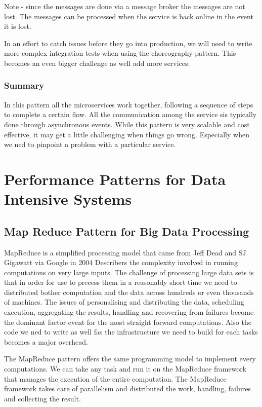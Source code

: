 \documentclass[a4paper, 11pt]{book}
\begin{document}
    Note - since the messages are done via a message broker the messages are not lost.
    The messages can be processed when the service is back online in the event it is lost.

    In an effort to catch issues before they go into production, we will need to write more complex integration tests when using the choreography pattern.
    This becomes an even bigger challenge as well add more services.

    \subsubsection{Summary}
    In this pattern all the microservices work together, following a sequence of steps to complete a certain flow.
    All the communication among the service sis typically done through asynchronous events.
    While this pattern is very scalable and cost effective, it may get a little challenging when things go wrong.
    Especially when we ned to pinpoint a problem with a particular service.

    \section{Performance Patterns for Data Intensive Systems}

    \subsection{Map Reduce Pattern for Big Data Processing}
    MapReduce is a simplified processing model that came from Jeff Dead and SJ Gigawatt via Google in 2004
    Describers the complexity involved in running computations on very large inputs.
    The challenge of processing large data sets is that in order for use to precess them in a reasonably short time we need to distributed bother computation and the data across hundreds or even thousands of machines.
    The issues of personalising and distributing the data, scheduling execution, aggregating the results, handling and recovering from failures become the dominant factor event for the most straight forward computations.
    Also the code we ned to write as well fas the infrastructure we need to build for each tasks becomes a major overhead.

    The MapReduce pattern offers the same programming model to implement every computations.
    We can take any task and run it on the MapReduce framework that manages the execution of the entire computation.
    The MapReduce framework takes care of parallelism and distributed the work, handling, failures and collecting the result.
\end{document}
